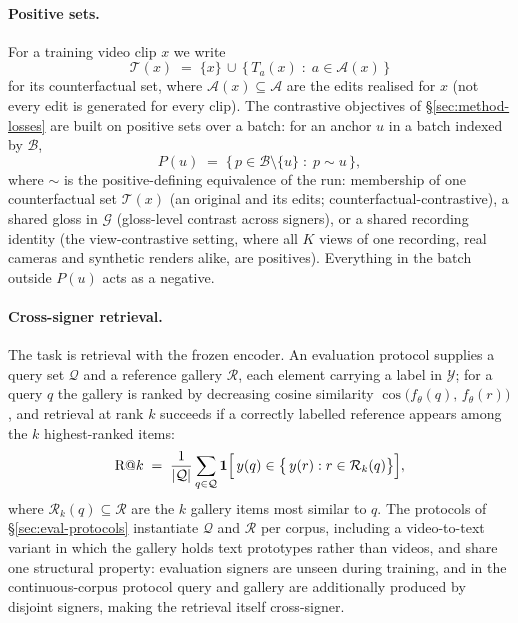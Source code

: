 \paragraph{Positive sets.}
For a training video clip $x$ we write
\begin{equation}
\label{eq:cf-set}
\mathcal{T}(x) \;=\; \{x\} \,\cup\,
\bigl\{\, T_a(x) \;:\; a \in \mathcal{A}(x) \,\bigr\}
\end{equation}
for its counterfactual set, where $\mathcal{A}(x) \subseteq \mathcal{A}$
are the edits realised for $x$ (not every edit is generated for every
clip). The contrastive objectives of \S\ref{sec:method-losses} are built
on positive sets over a batch: for an anchor $u$ in a batch indexed by
$\mathcal{B}$,
\begin{equation}
\label{eq:positive-set}
P(u) \;=\; \bigl\{\, p \in \mathcal{B} \setminus \{u\}
\;:\; p \sim u \,\bigr\},
\end{equation}
where $\sim$ is the positive-defining equivalence of the run: membership
of one counterfactual set $\mathcal{T}(x)$ (an original and its edits;
counterfactual-contrastive), a shared gloss in $\mathcal{G}$ (gloss-level
contrast across signers), or a shared recording identity (the view-contrastive setting,
where all $K$ views of one recording, real cameras and synthetic
renders alike, are positives). Everything in the batch outside $P(u)$
acts as a negative.

\paragraph{Cross-signer retrieval.}
The task is retrieval with the frozen encoder. An evaluation protocol
supplies a query set $\mathcal{Q}$ and a reference gallery $\mathcal{R}$,
each element carrying a label in $\mathcal{Y}$; for a query $q$ the
gallery is ranked by decreasing cosine similarity
$\cos\bigl(f_\theta(q),\, f_\theta(r)\bigr)$, and retrieval at rank $k$
succeeds if a correctly labelled reference appears among the $k$
highest-ranked items:
\begin{equation}
\label{eq:recall-at-k}
\mathrm{R}@k \;=\; \frac{1}{|\mathcal{Q}|} \sum_{q \in \mathcal{Q}}
\mathbf{1}\Bigl[\, y(q) \in \bigl\{\, y(r) : r \in \mathcal{R}_k(q)
\bigr\} \Bigr],
\end{equation}
where $\mathcal{R}_k(q) \subseteq \mathcal{R}$ are the $k$ gallery items
most similar to $q$. The protocols of \S\ref{sec:eval-protocols}
instantiate $\mathcal{Q}$ and $\mathcal{R}$ per corpus, including a
video-to-text variant in which the gallery holds text prototypes rather
than videos, and share one structural property: evaluation signers are
unseen during training, and in the continuous-corpus protocol query and
gallery are
additionally produced by disjoint signers, making the retrieval itself
cross-signer.

